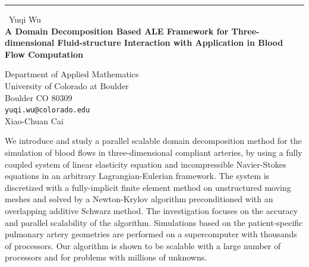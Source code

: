 \documentclass{report}
\begin{document}
\begin{center}
\rule{6in}{1pt} \
{\large Yuqi Wu \\
{\bf A Domain Decomposition Based ALE Framework for Three-dimensional Fluid-structure Interaction with Application in Blood Flow Computation}}

Department of Applied Mathematics \\ University of Colorado at Boulder \\ Boulder CO 80309
\\
{\tt yuqi.wu@colorado.edu}\\
Xiao-Chuan Cai\end{center}

We introduce and study a parallel scalable domain decomposition method
for the simulation of blood flows in three-dimensional compliant
arteries, by using a fully coupled system of linear elasticity equation
and incompressible Navier-Stokes equations in an arbitrary
Lagrangian-Eulerian framework. The system is discretized with a
fully-implicit finite element method on unstructured moving meshes and
solved by a Newton-Krylov algorithm preconditioned with an overlapping
additive Schwarz method. The investigation focuses on the accuracy and
parallel scalability of the algorithm. Simulations based on the
patient-specific pulmonary artery geometries are performed on a
supercomputer with thousands of processors. Our algorithm is shown to be
scalable with a large number of processors and for problems with millions
of unknowns.
\end{document}

